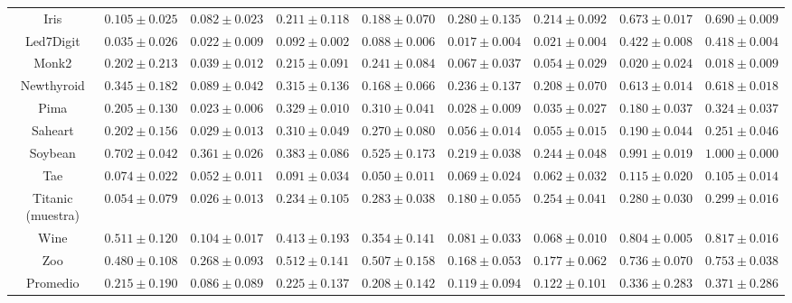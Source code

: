 \begin{landscape}
\begin{table}
{\begin{tabular}{|c|cccccccc|}
	Iris & $0.105 \pm 0.025$ & $0.082 \pm 0.023$ & $0.211 \pm 0.118$ & $0.188 \pm 0.070$ & $0.280 \pm 0.135$ & $0.214 \pm 0.092$ & $0.673 \pm 0.017$ & $0.690 \pm 0.009$\\ 
	Led7Digit & $0.035 \pm 0.026$ & $0.022 \pm 0.009$ & $0.092 \pm 0.002$ & $0.088 \pm 0.006$ & $0.017 \pm 0.004$ & $0.021 \pm 0.004$ & $0.422 \pm 0.008$ & $0.418 \pm 0.004$\\ 
	Monk2 & $0.202 \pm 0.213$ & $0.039 \pm 0.012$ & $0.215 \pm 0.091$ & $0.241 \pm 0.084$ & $0.067 \pm 0.037$ & $0.054 \pm 0.029$ & $0.020 \pm 0.024$ & $0.018 \pm 0.009$\\ 
	Newthyroid & $0.345 \pm 0.182$ & $0.089 \pm 0.042$ & $0.315 \pm 0.136$ & $0.168 \pm 0.066$ & $0.236 \pm 0.137$ & $0.208 \pm 0.070$ & $0.613 \pm 0.014$ & $0.618 \pm 0.018$\\ 
	Pima & $0.205 \pm 0.130$ & $0.023 \pm 0.006$ & $0.329 \pm 0.010$ & $0.310 \pm 0.041$ & $0.028 \pm 0.009$ & $0.035 \pm 0.027$ & $0.180 \pm 0.037$ & $0.324 \pm 0.037$\\ 
	Saheart & $0.202 \pm 0.156$ & $0.029 \pm 0.013$ & $0.310 \pm 0.049$ & $0.270 \pm 0.080$ & $0.056 \pm 0.014$ & $0.055 \pm 0.015$ & $0.190 \pm 0.044$ & $0.251 \pm 0.046$\\ 
	Soybean & $0.702 \pm 0.042$ & $0.361 \pm 0.026$ & $0.383 \pm 0.086$ & $0.525 \pm 0.173$ & $0.219 \pm 0.038$ & $0.244 \pm 0.048$ & $0.991 \pm 0.019$ & $1.000 \pm 0.000$\\ 
	Tae & $0.074 \pm 0.022$ & $0.052 \pm 0.011$ & $0.091 \pm 0.034$ & $0.050 \pm 0.011$ & $0.069 \pm 0.024$ & $0.062 \pm 0.032$ & $0.115 \pm 0.020$ & $0.105 \pm 0.014$\\ 
	Titanic (muestra) & $0.054 \pm 0.079$ & $0.026 \pm 0.013$ & $0.234 \pm 0.105$ & $0.283 \pm 0.038$ & $0.180 \pm 0.055$ & $0.254 \pm 0.041$ & $0.280 \pm 0.030$ & $0.299 \pm 0.016$\\ 
	Wine & $0.511 \pm 0.120$ & $0.104 \pm 0.017$ & $0.413 \pm 0.193$ & $0.354 \pm 0.141$ & $0.081 \pm 0.033$ & $0.068 \pm 0.010$ & $0.804 \pm 0.005$ & $0.817 \pm 0.016$\\ 
	Zoo & $0.480 \pm 0.108$ & $0.268 \pm 0.093$ & $0.512 \pm 0.141$ & $0.507 \pm 0.158$ & $0.168 \pm 0.053$ & $0.177 \pm 0.062$ & $0.736 \pm 0.070$ & $0.753 \pm 0.038$\\ 
	\hline
	Promedio & $0.215 \pm 0.190$ & $0.086 \pm 0.089$ & $0.225 \pm 0.137$ & $0.208 \pm 0.142$ & $0.119 \pm 0.094$ & $0.122 \pm 0.101$ & $0.336 \pm 0.283$ & $0.371 \pm 0.286$\\
	\hline
	\end{tabular}
}
\end{table}



\end{landscape}
